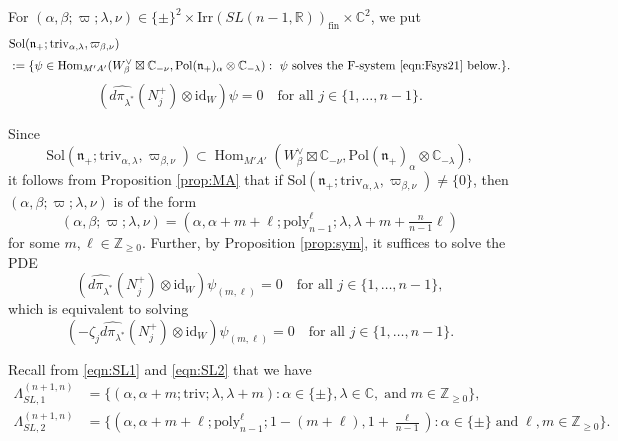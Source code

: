 \documentclass[reqno,11pt]{amsart}
\theoremstyle{remark}
\theoremstyle{definition}
\numberwithin{equation}{section}
\newcommand{\gb}{\beta}
\newcommand{\ga}{\alpha}
\newcommand{\gL}{\Lambda}
\newcommand{\fn}{{\mathfrak n}}
\newcommand{\R}{\mathbb{R}}
\newcommand{\C}{\mathbb{C}}
\newcommand{\Z}{\mathbb{Z}}
\newcommand{\Hom}{\operatorname{Hom}}
\newcommand{\Sol}{\mathrm{Sol}}
\newcommand{\Pol}{\mathrm{Pol}}
\newcommand{\poly}{\mathrm{poly}}
\newcommand{\Irr}{\mathrm{Irr}}
\newcommand{\triv}{\mathrm{triv}}
\newcommand{\fin}{\mathrm{fin}}
\newcommand{\dpi}{d\pi}
\newcommand{\id}{\mathrm{id}}
\begin{document}
For $(\ga, \gb; \varpi; \lambda,\nu) \in \{\pm\}^2\times \Irr(SL(n-1,\R))_\fin \times 
\C^2$, we put
\begin{align*}
&\Sol(\fn_+; \triv_{\alpha, \lambda}, \varpi_{\beta, \nu})\\[3pt]
&:=
\{ \psi \in 
\Hom_{M'A'}(W_{\beta}^\vee\boxtimes \C_{-\nu}, 
\Pol(\fn_+)_{\alpha}\otimes \C_{-\lambda}): 
\text{
$\psi$ solves the F-system \eqref{eqn:Fsys21} below.}\}.
\end{align*}
\begin{equation}\label{eqn:Fsys21}
(\widehat{\dpi_{\lambda^*}}(N_j^+)\otimes \id_W)\psi =0 
\quad
\text{for all $j \in \{1,\ldots, n-1\}$}.
\end{equation}

Since
\begin{equation*}
\Sol(\fn_+; \triv_{\alpha, \lambda}, \varpi_{\beta, \nu})
\subset
\Hom_{M'A'}(W_{\beta}^\vee\boxtimes \C_{-\nu}, 
\Pol(\fn_+)_{\alpha}\otimes \C_{-\lambda}),
\end{equation*}
it follows  from
Proposition \ref{prop:MA}  that
if $\Sol(\fn_+; \triv_{\alpha, \lambda}, \varpi_{\beta, \nu})\neq \{0\}$,
then $(\alpha, \beta; \varpi; \lambda, \nu)$ is of the form
\begin{equation}\label{eqn:param}
(\alpha, \beta; \varpi; \lambda, \nu)=
(\ga, \ga+m+\ell; \poly^\ell_{n-1}; \lambda, \lambda + m+\tfrac{n}{n-1}\ell)
\end{equation}
for some $m, \ell \in \Z_{\geq 0}$. Further, by Proposition \ref{prop:sym}, 
it suffices to solve the PDE 
\begin{equation*}
(\widehat{\dpi_{\lambda^*}}(N_j^+)\otimes \id_W)\psi_{(m,\ell)} =0 
\quad
\text{for all $j \in \{1,\ldots, n-1\}$},
\end{equation*}
which is equivalent to solving
\begin{equation}\label{eqn:Fsys2}
(-\zeta_j\widehat{\dpi_{\lambda^*}}(N_j^+)\otimes \id_W)\psi_{(m,\ell)} =0 
\quad
\text{for all $j \in \{1,\ldots, n-1\}$}.
\end{equation}

Recall from \eqref{eqn:SL1} and \eqref{eqn:SL2} that we have 
\begin{align*}
\gL^{(n+1,n)}_{SL,1}&=\{
(\alpha, \alpha+m;\triv; \lambda, 
\lambda+m) : \alpha \in \{\pm\}, \lambda \in \C, \; \text{and} \; m\in \Z_{\geq 0}\},\\[3pt]
\gL^{(n+1,n)}_{SL,2}&=\{
(\alpha, \alpha+m+\ell;\poly_{n-1}^\ell; 1-(m+\ell), 
1+\tfrac{\ell}{n-1}) : \alpha \in \{\pm\} \; \text{and} \; \ell, m\in \Z_{\geq 0}\}.
\end{align*}
\end{document}
